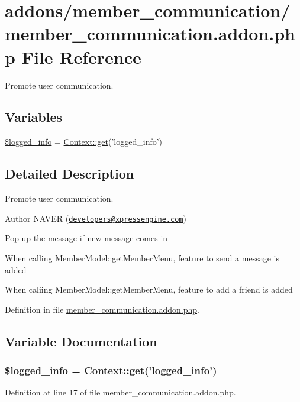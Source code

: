 \hypertarget{member__communication_8addon_8php}{\section{addons/member\-\_\-communication/member\-\_\-communication.addon.\-php File Reference}
\label{member__communication_8addon_8php}
}


Promote user communication.  


\subsection*{Variables}
\begin{DoxyCompactItemize}
\item 
\hyperlink{member__communication_8addon_8php_a193c1593ceb216e9fb05b0bad01ebbc8}{\$logged\-\_\-info} = \hyperlink{classContext_a90ce25d65fe6c9778421cbb36ab3def5}{Context\-::get}('logged\-\_\-info')
\end{DoxyCompactItemize}


\subsection{Detailed Description}
Promote user communication. \begin{DoxyAuthor}{Author}
N\-A\-V\-E\-R (\href{mailto:developers@xpressengine.com}{\tt developers@xpressengine.\-com})
\begin{DoxyItemize}
\item Pop-\/up the message if new message comes in
\item When calling Member\-Model\-::get\-Member\-Menu, feature to send a message is added
\item When caliing Member\-Model\-::get\-Member\-Menu, feature to add a friend is added 
\end{DoxyItemize}
\end{DoxyAuthor}


Definition in file \hyperlink{member__communication_8addon_8php_source}{member\-\_\-communication.\-addon.\-php}.



\subsection{Variable Documentation}
\hypertarget{member__communication_8addon_8php_a193c1593ceb216e9fb05b0bad01ebbc8}{
\subsubsection[{\$logged\-\_\-info}]{\setlength{\rightskip}{0pt plus 5cm}\$logged\-\_\-info = {\bf Context\-::get}('logged\-\_\-info')}}\label{member__communication_8addon_8php_a193c1593ceb216e9fb05b0bad01ebbc8}


Definition at line 17 of file member\-\_\-communication.\-addon.\-php.

